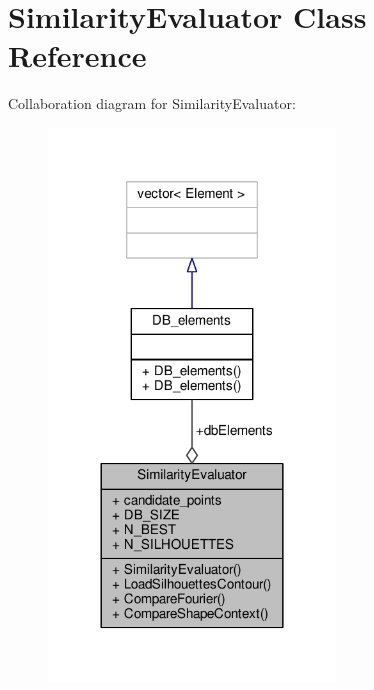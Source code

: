 \hypertarget{class_similarity_evaluator}{}\section{Similarity\+Evaluator Class Reference}
\label{class_similarity_evaluator}


Collaboration diagram for Similarity\+Evaluator\+:
\nopagebreak
\begin{figure}[H]
\begin{center}
\leavevmode
\includegraphics[width=216pt]{class_similarity_evaluator__coll__graph}
\end{center}
\end{figure}
